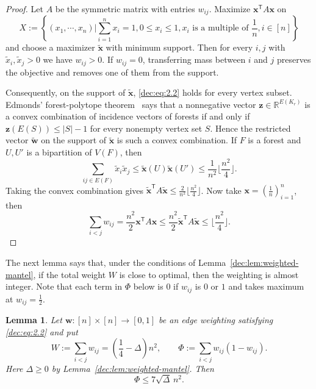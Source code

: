 \documentclass[11pt]{article}
\numberwithin{equation}{section}
\newtheorem{lemma}[theorem]{Lemma}
\theoremstyle{remark}
\newcommand{\R}{\mathbb R}
\begin{document}
\begin{proof}
Let \(A\) be the symmetric matrix with entries \(w_{ij}\). Maximize \(\mathbf{x}^{\mathsf T}A\mathbf{x}\) on
\begin{equation*}
  X:=\left\{(x_1, \cdots, x_n)|\sum_{i=1}^nx_i=1, 0\leq x_i\leq1, x_i \text{\ is a multiple of\ } \frac{1}{n}, i\in [n]\right\}
\end{equation*}
and choose a maximizer \(\widetilde{\mathbf{x}}\) with minimum support.
Then for every \(i,j\) with \(\widetilde{x}_i,\widetilde{x}_j>0\) we have \(w_{ij}>0\). 
If \(w_{ij}=0\), transferring mass between \(i\) and \(j\) preserves the objective and removes one of them from the support.

Consequently, on the support of \(\widetilde{\mathbf{x}}\), \eqref{dec:eq:2.2} holds for every vertex
subset.  Edmonds' forest-polytope theorem~\cite{Edmonds} says that a nonnegative vector \(\mathbf{z}\in\R^{E(K_r)}\)
is a convex combination of incidence vectors of forests if and only if
\(\mathbf{z}(E(S))\le |S|-1\) for every nonempty vertex set \(S\).  Hence the
restricted vector \(\widetilde{\mathbf{w}}\) on the support of \(\widetilde{\mathbf x}\) is such a convex combination.
If \(F\) is a forest and \(U,U'\) is a bipartition of \(V(F)\), then
\begin{equation*}
  \sum_{ij\in E(F)}\widetilde{x}_i\widetilde{x}_j
  \le \widetilde{\mathbf{x}}(U)\widetilde{\mathbf{x}}(U')\le\frac{1}{n^2}\lfloor\frac{n^2}{4}\rfloor.
\end{equation*}
Taking the convex combination gives \(\widetilde{\mathbf{x}}^{\mathsf T}A\widetilde{\mathbf{x}}\le\frac{2}{n^2}\lfloor\frac{n^2}{4}\rfloor\).
Now take \(\mathbf{x}=\left(\frac{1}{n}\right)_{i=1}^n\), then
\begin{equation*}
\sum_{i<j}w_{ij} = \frac{n^2}{2}\mathbf{x}^{\mathsf T}A\mathbf{x} \le \frac{n^2}{2}\widetilde{\mathbf{x}}^{\mathsf T}A\widetilde{\mathbf{x}} \le \lfloor\frac{n^2}{4}\rfloor.
\end{equation*}
\end{proof}

The next lemma says that, under the conditions of Lemma~\ref{dec:lem:weighted-mantel},
if the total weight \(W\) is close to optimal, then the weighting is almost integer.
Note that each term in \(\Phi\) below is \(0\) if \(w_{ij}\) is \(0\) or \(1\) and takes maximum at \(w_{ij}=\frac12\).

\begin{lemma}
\label{dec:lem:weight-near-integrality}
Let \(\mathbf{w}:[n]\times[n]\to[0,1]\) be an edge weighting
satisfying \emph{\eqref{dec:eq:2.2}} and put
\begin{equation*}
 W:=\sum_{i<j}w_{ij}=\left(\frac14-\Delta\right)n^2,\qquad
 \Phi:=\sum_{i<j}w_{ij}(1-w_{ij}).
\end{equation*}
Here \(\Delta\ge0\) by Lemma~\ref{dec:lem:weighted-mantel}. Then
\begin{equation}\label{dec:eq:assertion}
 \Phi\le7\sqrt{\Delta}\,n^2.
\end{equation}
\end{lemma}
\end{document}
